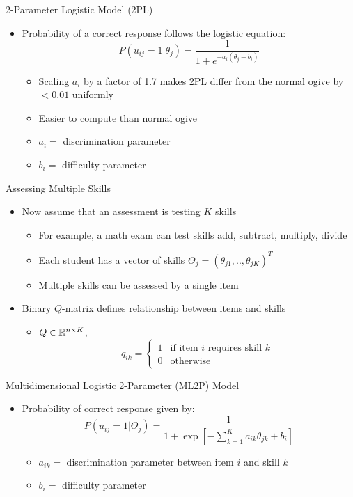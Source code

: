 \documentclass{beamer}
\def \R{\ensuremath \mathbb{R}}
\theoremstyle{definition}
\begin{document}
\begin{frame}{2-Parameter Logistic Model (2PL)}
\begin{itemize}
  \item Probability of a correct response follows the logistic equation:
  \[P(u_{ij} = 1 | \theta_j) = \frac{1}{1 + e^{-a_i(\theta_j - b_i)}}\]
  \begin{itemize}
    \item<2-> Scaling $a_i$ by a factor of 1.7 makes 2PL differ from the normal ogive by $<0.01$ uniformly
    \item<2-> Easier to compute than normal ogive
    \item<2-> $a_i =$ discrimination parameter
    \item<2-> $b_i =$ difficulty parameter
  \end{itemize}
\end{itemize}
\end{frame}


\begin{frame}{Assessing Multiple Skills}
\begin{itemize}
  \item Now assume that an assessment is testing $K$ skills
  \begin{itemize}
    \item For example, a math exam can test skills add, subtract, multiply, divide
    \item Each student has a vector of skills $\Theta_j = (\theta_{j1},.., \theta_{jK})^T$
    \item Multiple skills can be assessed by a single item
  \end{itemize}
  \item<2-> Binary $Q$-matrix defines relationship between items and skills
  \begin{itemize}
    \item<2-> $Q \in \R^{n \times K}$, \[q_{ik} = \begin{cases}
    1 & \text{if item } i \text{ requires skill } k \\ 
    0 & \text{otherwise} 
    \end{cases}\]
  \end{itemize}
\end{itemize}
\end{frame}

\begin{frame}{Multidimensional Logistic 2-Parameter (ML2P) Model}
\begin{itemize}
\item Probability of correct response given by:
  \[P(u_{ij}=1 | \Theta_j) = \frac{1}{1 + \exp[-\sum_{k=1}^K a_{ik}\theta_{jk} + b_i]}\]
  \begin{itemize}
    \item<2-> $a_{ik} =$ discrimination parameter between item $i$ and skill $k$ 
    \item<2-> $b_i =$ difficulty parameter
  \end{itemize}
\end{itemize}
\end{frame}
\end{document}
